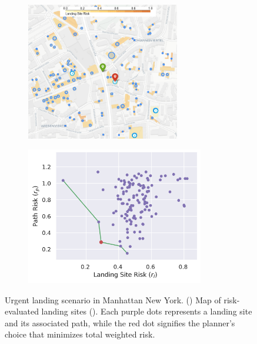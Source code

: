\begin{figure}
    \centering
    \begin{subfigure}[b]{0.44\linewidth}
        \centering\includegraphics[clip, width=\linewidth, height=170pt]{chapter_5_mapping/imgs/witten_scenario_1.png}
        \caption{\label{fig:ch5_ny_map1}}
    \end{subfigure}
    \begin{subfigure}[b]{0.49\linewidth}
        \centering\includegraphics[clip, width=\linewidth, height=170pt]{chapter_5_mapping/imgs/PaertoFront.png}
        \caption{\label{fig:ch5_ny_pareto}}
    \end{subfigure}
    \caption{Urgent landing scenario in Manhattan New York. () Map of risk-evaluated landing sites (). Each purple dots represents a landing site and its associated path, while the red dot signifies the planner's choice that minimizes total weighted risk. }
    \label{fig:ch5_landing_site_selection}
\end{figure}



